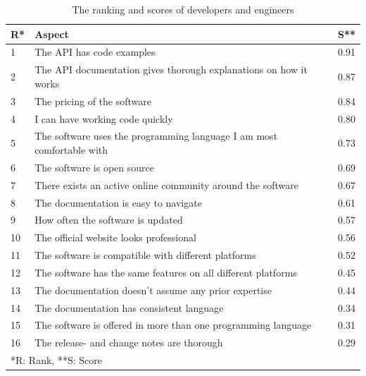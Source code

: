 \documentclass{article}
\begin{document}
\begin{table}[H]
\centering
\begin{tabularx}{\columnwidth}{ l X r}

{\textbf{R}*} &   \textbf{Aspect}   & {\textbf{S}**} \\ \hline
1 &      The API has code examples                                             &  0.91             \\ \hline
2 &      The API documentation gives thorough explanations on how it works     &  0.87             \\ \hline
3 &      The pricing of the software                                           &  0.84             \\ \hline
4 &      I can have working code quickly                                       &  0.80             \\ \hline
5 &      The software uses the programming language I am most comfortable with &  0.73             \\ \hline
6 &      The software is open source                                           &  0.69             \\ \hline
7 &      There exists an active online community around the software           &  0.67             \\ \hline
8 &      The documentation is easy to navigate                                 &  0.61             \\ \hline
9 &      How often the software is updated                                     &  0.57             \\ \hline
10 &      The official website looks professional                               &  0.56             \\ \hline
11 &      The software is compatible with different platforms                   &  0.52             \\ \hline
12 &      The software has the same features on all different platforms         &  0.45             \\ \hline
13 &      The documentation doesn't assume any prior expertise                  &  0.44             \\ \hline
14 &      The documentation has consistent language                             &  0.34             \\ \hline
15 &      The software is offered in more than one programming language         &  0.31             \\ \hline
16 &      The release- and change notes are thorough                            &  0.29             \\ \hline \hline
\multicolumn{3}{l}{*R: Rank, **S: Score}
\end{tabularx}
\caption{The ranking and scores of developers and engineers}
\label{tab:devs}
\end{table}
\end{document}
